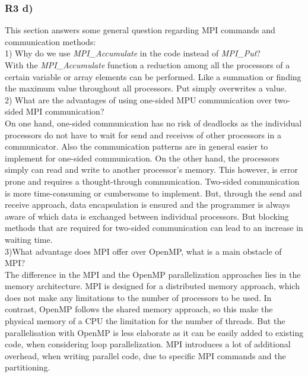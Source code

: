 \subsubsection{R3 d)}

This section answers some general question regarding MPI commands and communication methods:\\

1) Why do we use \textit{MPI\_Accumulate} in the code instead of \textit{MPI\_Put}?\\

With the \textit{MPI\_Accumulate} function a reduction among all the processors of a certain variable or array elements can be performed. Like a summation or finding the maximum value throughout all processors. Put simply overwrites a value.\\

2) What are the advantages of using one-sided MPU communication over two-sided MPI communication?\\

On one hand, one-sided communication has no risk of deadlocks as the individual processors do not have to wait for send and receives of other processors in a communicator. Also the communication patterns are in general easier to implement for one-sided communication. On the other hand, the processors simply can read and write to another processor's memory. This however, is error prone and requires a thought-through communication. 
Two-sided communication is more time-consuming or cumbersome to implement. But, through the send and receive approach, data encapsulation is ensured and the programmer is always aware of which data is exchanged between individual processors. But blocking methods that are required for two-sided communication can lead to an increase in waiting time.\\

3)What advantage does MPI offer over OpenMP, what is a main obstacle of MPI?\\

The difference in the MPI and the OpenMP parallelization approaches lies in the memory architecture. MPI is designed for a distributed memory approach, which does not make any limitations to the number of processors to be used. In contrast, OpenMP follows the shared memory approach, so this make the physical memory of a CPU the limitation for the number of threads. But the parallelisation with OpenMP is less elaborate as it can be easily added to existing code, when considering loop parallelization. MPI introduces a lot of additional overhead, when writing parallel code, due to specific MPI commands and the partitioning.

